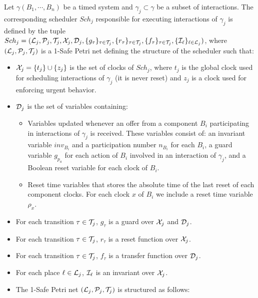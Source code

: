 \begin{definition}[Scheduler]\label{def:sch_sr}
  Let $\gamma(B_1,\cdots,B_n)$ be a timed system and $\gamma_j\subset\gamma$ be a subset of
  interactions. The corresponding scheduler $Sch_j$ responsible for executing interactions
  of $\gamma_j$ is defined by the tuple  
  $Sch_j=(\mathcal{L}_j, \mathcal{P}_j,\mathcal{T}_j,\mathcal{X}_j, \mathcal{D}_j,\{g_{\tau}\}_{\tau\in\mathcal{T}_j},
  \{r_{\tau}\}_{\tau\in\mathcal{T}_j},\{f_{\tau}\}_{\tau\in\mathcal{T}_j},\{\mathcal{I}_{\ell}\}_{\ell\in\mathcal{L}_j})
  $, where $(\mathcal{L}_j,\mathcal{P}_j,\mathcal{T}_j)$ is a 1-Safe Petri net defining 
      the structure of the scheduler such that:
  \begin{itemize}
    \item $\mathcal{X}_j=\{t_j\}\cup\{z_j\}$ is the set of clocks of $Sch_j$, where $t_j$ is
      the global clock used for scheduling interactions of $\gamma_j$ (it is never reset)
      and $z_j$ is a clock used for enforcing urgent behavior. 
    \item $\mathcal{D}_j$ is the set of variables containing:
      \begin{itemize}
        \item Variables updated whenever an offer from a component $B_i$ participating in 
          interactions of $\gamma_j$ is received. These variables consist of: an invariant
          variable $inv_{B_i}$ and a participation number $n_{B_i}$ for each $B_i$, 
          a guard variable $g_{p_a}$ for each action of $B_i$ involved in an interaction of 
          $\gamma_j$, and a Boolean reset variable for each clock of $B_i$.
        \item Reset time variables that stores the absolute time of the last reset of 
          each component clocks. For each clock $x$ of $B_i$ we include a reset time 
          variable $\rho_x$.
      \end{itemize}
    \item For each transition $\tau\in\mathcal{T}_j$, $g_{\tau}$ is a guard over 
      $\mathcal{X}_j$ and $\mathcal{D}_j$.
    \item For each transition $\tau\in\mathcal{T}_j$, $r_{\tau}$ is a reset function over $\mathcal{X}_j$.
    \item For each transition $\tau\in\mathcal{T}_j$, $f_{\tau}$ is a transfer function over $\mathcal{D}_j$.
    \item For each place $\ell\in\mathcal{L}_j$, $\mathcal{I}_{\ell}$ is an invariant over $\mathcal{X}_j$. 
    \item The 1-Safe Petri net $(\mathcal{L}_j,\mathcal{P}_j,\mathcal{T}_j)$ is structured as follows:
      \begin{itemize}

\end{itemize}
\end{itemize}
\end{definition}
